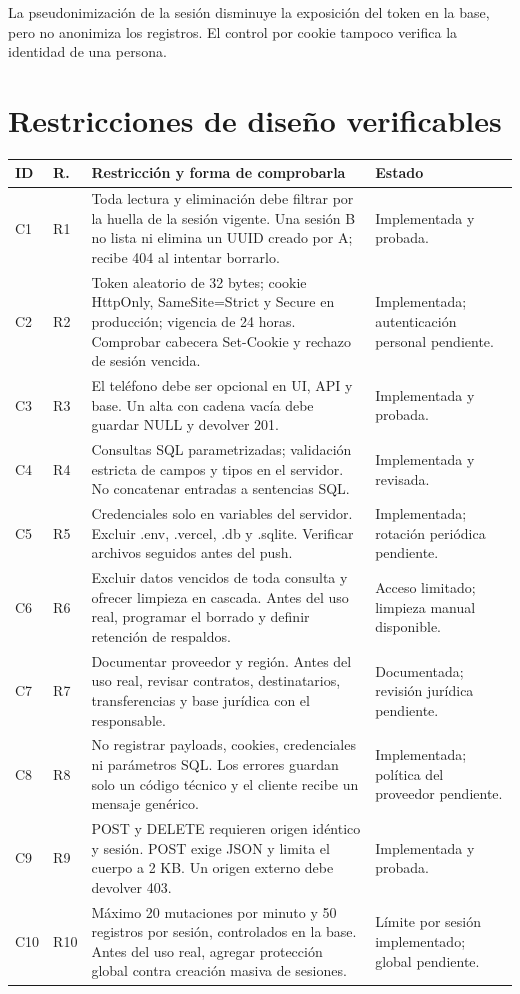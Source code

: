 \documentclass[11pt,a4paper]{article}
\begin{document}
La pseudonimización de la sesión disminuye la exposición del token en la base, pero no anonimiza los registros. El control por cookie tampoco verifica la identidad de una persona.

\newpage
\section{Restricciones de diseño verificables}
{\small
\begin{tabularx}{\textwidth}{@{}P{.7cm}P{.9cm}YP{2.1cm}@{}}
\toprule
\textbf{ID} & \textbf{R.} & \textbf{Restricción y forma de comprobarla} & \textbf{Estado}\\
\midrule
C1 & R1 & Toda lectura y eliminación debe filtrar por la huella de la sesión vigente. Una sesión B no lista ni elimina un UUID creado por A; recibe 404 al intentar borrarlo. & Implementada y probada.\\
C2 & R2 & Token aleatorio de 32 bytes; cookie HttpOnly, SameSite=Strict y Secure en producción; vigencia de 24 horas. Comprobar cabecera Set-Cookie y rechazo de sesión vencida. & Implementada; autenticación personal pendiente.\\
C3 & R3 & El teléfono debe ser opcional en UI, API y base. Un alta con cadena vacía debe guardar NULL y devolver 201. & Implementada y probada.\\
C4 & R4 & Consultas SQL parametrizadas; validación estricta de campos y tipos en el servidor. No concatenar entradas a sentencias SQL. & Implementada y revisada.\\
C5 & R5 & Credenciales solo en variables del servidor. Excluir .env, .vercel, .db y .sqlite. Verificar archivos seguidos antes del push. & Implementada; rotación periódica pendiente.\\
C6 & R6 & Excluir datos vencidos de toda consulta y ofrecer limpieza en cascada. Antes del uso real, programar el borrado y definir retención de respaldos. & Acceso limitado; limpieza manual disponible.\\
C7 & R7 & Documentar proveedor y región. Antes del uso real, revisar contratos, destinatarios, transferencias y base jurídica con el responsable. & Documentada; revisión jurídica pendiente.\\
C8 & R8 & No registrar payloads, cookies, credenciales ni parámetros SQL. Los errores guardan solo un código técnico y el cliente recibe un mensaje genérico. & Implementada; política del proveedor pendiente.\\
C9 & R9 & POST y DELETE requieren origen idéntico y sesión. POST exige JSON y limita el cuerpo a 2 KB. Un origen externo debe devolver 403. & Implementada y probada.\\
C10 & R10 & Máximo 20 mutaciones por minuto y 50 registros por sesión, controlados en la base. Antes del uso real, agregar protección global contra creación masiva de sesiones. & Límite por sesión implementado; global pendiente.\\
\bottomrule
\end{tabularx}}
\end{document}

